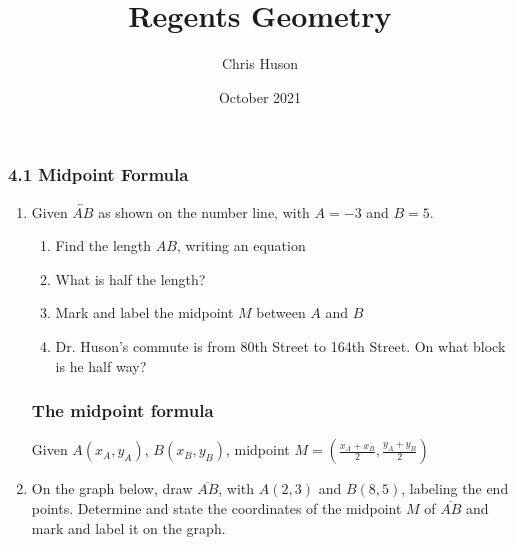 \documentclass[12pt, twoside]{article}
\title{Regents Geometry}
\author{Chris Huson}
\date{October 2021}
\begin{document}
\subsubsection*{4.1 Midpoint Formula}
\begin{enumerate}
\item Given $\overleftrightarrow{AB}$ as shown on the number line, with $A=-3$ and $B=5$. 
\begin{enumerate}
  \item Find the length $AB$, writing an equation
  \item What is half the length? 
  \item Mark and label the midpoint $M$ between $A$ and $B$\\[1cm]
  \item Dr. Huson's commute is from 80th Street to 164th Street. On what block is he half way?
\end{enumerate}
  \vspace{3cm}
  
  \subsubsection*{The midpoint formula}
  Given $A(x_A,y_A)$, $B(x_B,y_B)$, midpoint $\displaystyle M = \left(\frac{x_A+x_B}{2}, \frac{y_A+y_B}{2}\right)$
\item On the graph below, draw $\overline{AB}$, with $A(2,3)$ and $B(8,5)$, labeling the end points. Determine and state the coordinates of the midpoint $M$ of $\overline{AB}$ and mark and label it on the graph.
\begin{flushright}
\end{flushright}


\end{enumerate}
\end{document}
